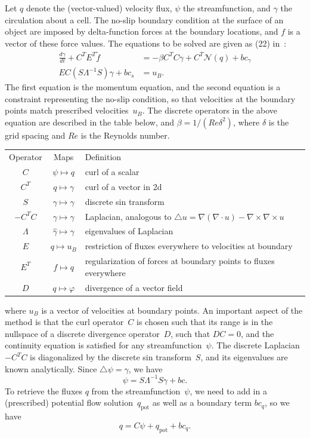 \documentclass[11pt]{article}
\begin{document}
Let $q$ denote the (vector-valued) velocity flux, $\psi$ the streamfunction, and $\gamma$ the circulation about a cell.  The no-slip boundary condition at the surface of an object are imposed by delta-function forces at the boundary locations, and $f$ is a vector of these force values.  The equations to be solved are given as (22) in~\cite{ColTai-07}:
\begin{align}
	\frac{d\gamma}{dt} + C^TE^T\tilde f &= -\beta C^TC\gamma + C^T\mathcal{N}(q) + bc_\gamma
	\label{eq:navier_stokes}\\
EC(S\Lambda^{-1}S)\gamma + bc_s &= u_B.
\label{eq:no_slip}
\end{align}
The first equation is the momentum equation, and the second equation is a constraint representing the no-slip condition, so that velocities at the boundary points match prescribed velocities~$u_B$. The discrete operators in the above equation are described in the table below, and $\beta=1/(Re\delta^2)$, where $\delta$ is the grid spacing and $Re$ is the Reynolds number.
\begin{center}
\begin{tabular}{ccp{3.7in}}
Operator & Maps & Definition\\
$C$ 	& $\psi\mapsto q$ & curl of a scalar\\
$C^T$ 	& $q\mapsto \gamma$ & curl of a vector in 2d\\
$S$ 	& $\gamma\mapsto\hat\gamma$ & discrete sin transform\\
$-C^TC$	& $\gamma\mapsto\gamma$ & Laplacian, analogous to $\triangle u = \nabla(\nabla\cdot u) - \nabla\times\nabla\times u$\\
$\Lambda$	& $\hat\gamma\mapsto\hat\gamma$ & eigenvalues of Laplacian\\
$E$ 	& $q\mapsto u_B$ & restriction of fluxes everywhere to velocities at boundary\\
$E^T$	& $f\mapsto q$ & regularization of forces at boundary points to fluxes everywhere\\
$D$		& $q\mapsto \varphi$ & divergence of a vector field
\end{tabular}
\end{center}
where $u_B$ is a vector of velocities at boundary points.  An important aspect of the method is that the curl operator~$C$ is chosen such that its range is in the nullspace of a discrete divergence operator~$D$, such that $DC=0$, and the continuity equation is satisfied for any streamfunction~$\psi$.  The discrete Laplacian $-C^TC$ is diagonalized by the discrete sin transform~$S$, and its eigenvalues are known analytically.  Since $\triangle\psi =\gamma$, we have
\begin{equation}
	\psi = S\Lambda^{-1}S\gamma + bc.
\label{eq:compute_psi}
\end{equation}
To retrieve the fluxes $q$ from the streamfunction~$\psi$, we need to add in a (prescribed) potential flow solution~$q_\text{pot}$ as well as a boundary term $bc_q$, so we have
\begin{equation}
	q = C\psi + q_\text{pot} + bc_q.
\label{eq:compute_q}
\end{equation}
\end{document}
